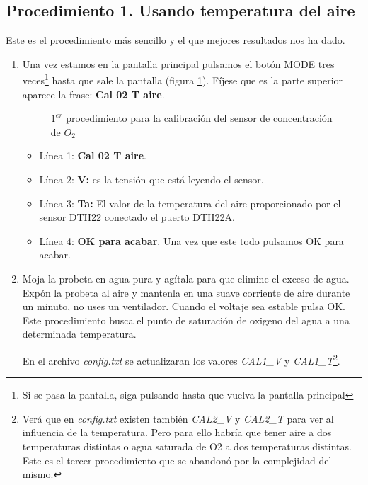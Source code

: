 \subsection{Procedimiento 1. Usando temperatura del aire}
Este es el procedimiento más sencillo y el que mejores resultados nos ha dado.
\begin{enumerate}
\item Una vez estamos en la pantalla principal pulsamos el botón MODE tres veces\footnote{Si se pasa la pantalla, siga pulsando hasta que vuelva la pantalla principal} hasta que sale la pantalla (figura \ref{patalla:O2aire}). Fíjese que es la parte superior aparece la frase: \textbf{Cal 02 T aire}.

\begin{figure}[htbp!] 
\caption{$1^{er}$ procedimiento para la calibración del sensor de concentración de $O_2$}\label{patalla:O2aire} 
\end{figure}

\begin{itemize}
\item Línea 1: \textbf{Cal 02 T aire}.
\item Línea 2: \textbf{V:} es la tensión que está leyendo el sensor.
\item Línea 3: \textbf{Ta:} El valor de la temperatura del aire proporcionado por el sensor DTH22 conectado el puerto DTH22A. 
\item Línea 4: \textbf{OK para acabar}. Una vez que este todo pulsamos OK para acabar.
\end{itemize}

\item Moja la probeta en agua pura y agítala para que elimine el exceso de agua. Expón la probeta al aire y mantenla en una suave corriente de aire durante un minuto, no uses un ventilador. Cuando el voltaje sea estable pulsa OK. Este procedimiento busca el punto de saturación de oxigeno del agua a una determinada temperatura.

En el archivo \emph{config.txt} se actualizaran los valores \emph{CAL1\_V} y \emph{CAL1\_T}\footnote{Verá que en \emph{config.txt} existen también \emph{CAL2\_V} y \emph{CAL2\_T} para ver al influencia de la temperatura. Pero para ello habría que tener aire a dos temperaturas distintas o agua saturada de O2 a dos temperaturas distintas. Este es el tercer procedimiento que se abandonó por la complejidad del mismo.}.
\end{enumerate}

